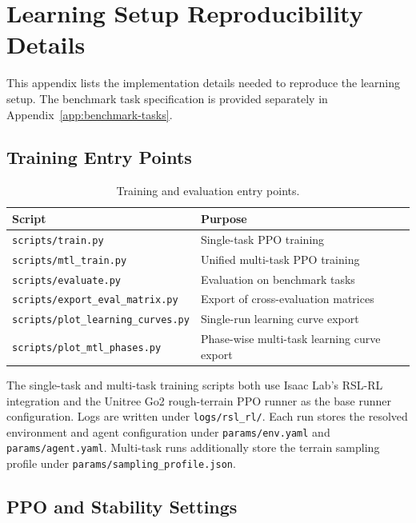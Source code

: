 \section{Learning Setup Reproducibility Details}
\label{app:learning-setup}

This appendix lists the implementation details needed to reproduce the learning setup. The benchmark task specification is provided separately in Appendix~\ref{app:benchmark-tasks}.

\subsection{Training Entry Points}
\label{app:training-entrypoints}

\begin{table}[htbp]
\centering
\caption{Training and evaluation entry points.}
\label{tab:learning-entrypoints}
\begin{tabular}{ll}
\toprule
Script & Purpose \\
\midrule
\texttt{scripts/train.py} & Single-task PPO training \\
\texttt{scripts/mtl\_train.py} & Unified multi-task PPO training \\
\texttt{scripts/evaluate.py} & Evaluation on benchmark tasks \\
\texttt{scripts/export\_eval\_matrix.py} & Export of cross-evaluation matrices \\
\texttt{scripts/plot\_learning\_curves.py} & Single-run learning curve export \\
\texttt{scripts/plot\_mtl\_phases.py} & Phase-wise multi-task learning curve export \\
\bottomrule
\end{tabular}
\end{table}

The single-task and multi-task training scripts both use Isaac Lab's RSL-RL integration and the Unitree Go2 rough-terrain PPO runner as the base runner configuration. Logs are written under \texttt{logs/rsl\_rl/}. Each run stores the resolved environment and agent configuration under \texttt{params/env.yaml} and \texttt{params/agent.yaml}. Multi-task runs additionally store the terrain sampling profile under \texttt{params/sampling\_profile.json}.

\subsection{PPO and Stability Settings}
\label{app:ppo-settings}

